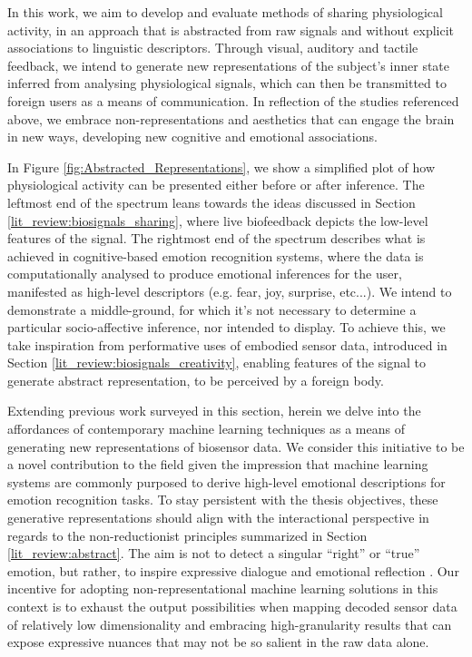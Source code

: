 In this work, we aim to develop and evaluate methods of sharing physiological activity, in an approach that is abstracted from raw signals and without explicit associations to linguistic descriptors. Through visual, auditory and tactile feedback, we intend to generate new representations of the subject's inner state inferred from analysing physiological signals, which can then be transmitted to foreign users as a means of communication. In reflection of the studies referenced above, we embrace non-representations and aesthetics that can engage the brain in new ways, developing new cognitive and emotional associations.

In Figure \ref{fig:Abstracted_Representations}, we show a simplified plot of how physiological activity can be presented either before or after inference. The leftmost end of the spectrum leans towards the ideas discussed in Section \ref{lit_review:biosignals_sharing}, where live biofeedback depicts the low-level features of the signal. The rightmost end of the spectrum describes what is achieved in cognitive-based emotion recognition systems, where the data is computationally analysed to produce emotional inferences for the user, manifested as high-level descriptors (e.g. fear, joy, surprise, etc...). We intend to demonstrate a middle-ground, for which it's not necessary to determine a particular socio-affective inference, nor intended to display. To achieve this, we take inspiration from performative uses of embodied sensor data, introduced in Section \ref{lit_review:biosignals_creativity}, enabling features of the signal to generate abstract representation, to be perceived by a foreign body.

Extending previous work surveyed in this section, herein we delve into the affordances of contemporary machine learning techniques as a means of generating new representations of biosensor data. We consider this initiative to be a novel contribution to the field given the impression that machine learning systems are commonly purposed to derive high-level emotional descriptions for emotion recognition tasks. To stay persistent with the thesis objectives, these generative representations should align with the interactional perspective in regards to the non-reductionist principles summarized in Section \ref{lit_review:abstract}. The aim is not to detect a singular ``right'' or ``true'' emotion, but rather, to inspire expressive dialogue and emotional reflection \cite{hook_affective_2009}. Our incentive for adopting non-representational machine learning solutions in this context is to exhaust the output possibilities when mapping decoded sensor data of relatively low dimensionality and embracing high-granularity results that can expose expressive nuances that may not be so salient in the raw data alone.

